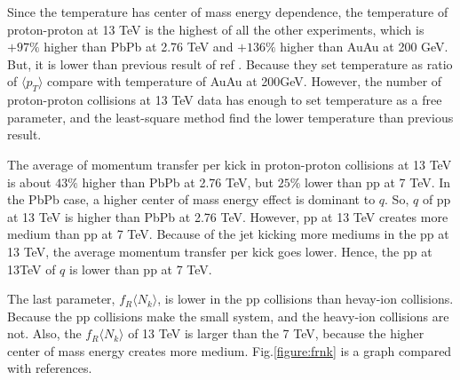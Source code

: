 \documentclass[jkps,fleqn,showpacs,showkeys]{revtex4}
\begin{document}
Since the temperature has center of mass energy dependence, the temperature of proton-proton at 13 TeV is the highest of all the other experiments, which is $+97\%$ higher than PbPb at 2.76 TeV and $+136\%$ higher than AuAu at 200 GeV.
But, it is lower than previous result of ref \cite{Hanul}.
Because they set temperature as ratio of $\langle p_T \rangle$ compare with temperature of AuAu at 200GeV.
However, the number of proton-proton collisions at 13 TeV data has enough to set temperature as a free parameter, and the least-square method find the lower temperature than previous result.

The average of momentum transfer per kick in proton-proton collisions at 13 TeV is about $43\%$ higher than PbPb at 2.76 TeV, but $25\%$ lower than pp at 7 TeV.
In the PbPb case, a higher center of mass energy effect is dominant to $q$.
So, $q$ of pp at 13 TeV is higher than PbPb at 2.76 TeV.
However, pp at 13 TeV creates more medium than pp at 7 TeV.
Because of the jet kicking more mediums in the pp at 13 TeV, the average momentum transfer per kick goes lower.
Hence, the pp at 13TeV of $q$ is lower than pp at 7 TeV.

The last parameter, $f_R \langle N_k \rangle$, is lower in the pp collisions than hevay-ion collisions.
Because the pp collisions make the small system, and the heavy-ion collisions are not.
Also, the $f_R \langle N_k \rangle$ of 13 TeV is larger than the 7 TeV, because the higher center of mass energy creates more medium.
Fig.\ref{figure:frnk} is a graph compared with references\cite{Wong_1, PbPb, Hanul}.



\end{document}
